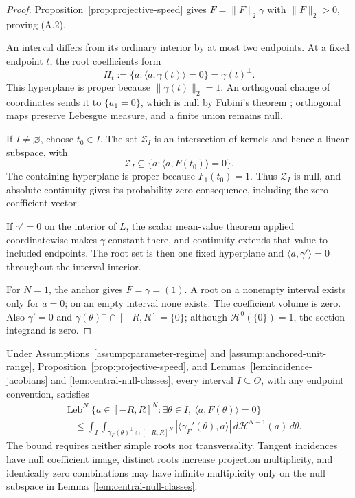 \begin{proof}
Proposition~\ref{prop:projective-speed} gives
$F=\|F\|_2\gamma$ with $\|F\|_2>0$, proving (A.2).

An interval differs from its ordinary interior by at most two endpoints.  At
a fixed endpoint $t$, the root coefficients form
\[
H_t:=\{a:\langle a,\gamma(t)\rangle=0\}=\gamma(t)^\perp.
\]
This hyperplane is proper because $\|\gamma(t)\|_2=1$.  An orthogonal change
of coordinates sends it to $\{a_1=0\}$, which is null by Fubini's theorem
\citep{bogachev2007measure}; orthogonal
maps preserve Lebesgue measure, and a finite union remains null.

If $I\neq\varnothing$, choose $t_0\in I$.  The set $\mathcal Z_I$ is an
intersection of kernels and hence a linear subspace, with
\[
\mathcal Z_I\subseteq\{a:\langle a,F(t_0)\rangle=0\}.
\]
The containing hyperplane is proper because $F_1(t_0)=1$.  Thus
$\mathcal Z_I$ is null, and absolute continuity gives its probability-zero
consequence, including the zero coefficient vector.

If $\gamma'=0$ on the interior of $L$, the scalar mean-value theorem
\citep{rudin1976principles} applied
coordinatewise makes $\gamma$ constant there, and continuity extends that
value to included endpoints.  The root set is then one fixed hyperplane and
$\langle a,\gamma'\rangle=0$ throughout the interval interior.

For $N=1$, the anchor gives $F=\gamma=(1)$.  A root on a nonempty interval
exists only for $a=0$; on an empty interval none exists.  The coefficient
volume is zero.  Also $\gamma'=0$ and
$\gamma(\theta)^\perp\cap[-R,R]=\{0\}$; although
$\mathcal H^0(\{0\})=1$, the section integrand is zero.
\end{proof}

\begin{proposition}
\label{prop:central-volume}
Under Assumptions~\ref{assump:parameter-regime} and
\ref{assump:anchored-unit-range}, Proposition~\ref{prop:projective-speed},
and Lemmas~\ref{lem:incidence-jacobians} and
\ref{lem:central-null-classes}, every interval $I\subseteq\Theta$, with any
endpoint convention, satisfies
\[
\begin{aligned}
&\operatorname{Leb}^N
\{a\in[-R,R]^N:\exists\theta\in I,
  \ \langle a,F(\theta)\rangle=0\}\\
&\quad\leq
\int_I\int_{\gamma_F(\theta)^\perp\cap[-R,R]^N}
 |\langle\gamma_F'(\theta),a\rangle|
 \,d\mathcal H^{N-1}(a)\,d\theta.
\end{aligned}
\tag{A.3}
\]
The bound requires neither simple roots nor transversality.  Tangent
incidences have null coefficient image, distinct roots increase projection
multiplicity, and identically zero combinations may have infinite
multiplicity only on the null subspace in
Lemma~\ref{lem:central-null-classes}.
\end{proposition}

